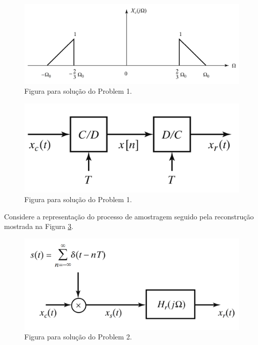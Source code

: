 \documentclass[12pt,a4paper]{article}
\begin{document}
\begin{figure}[h!]
    \centering
    \includegraphics[scale=0.5]{./figs/prob1.png}
    \caption{Figura para solução do Problem 1.}
    \label{fig:1}
\end{figure}

\begin{figure}[H]
    \centering
    \includegraphics[scale=0.5]{./figs/prob2.png}
    \caption{Figura para solução do Problem 1.}
    \label{fig:2}
\end{figure}

\answer
\problem Considere a representação do processo de amostragem seguido pela reconstrução mostrada na Figura \ref{fig:22}.

\begin{figure}[h!]
    \centering
    \includegraphics[scale=0.5]{./figs/prob22.png}
    \caption{Figura para solução do Problem 2.}
    \label{fig:22}
\end{figure}
\end{document}
